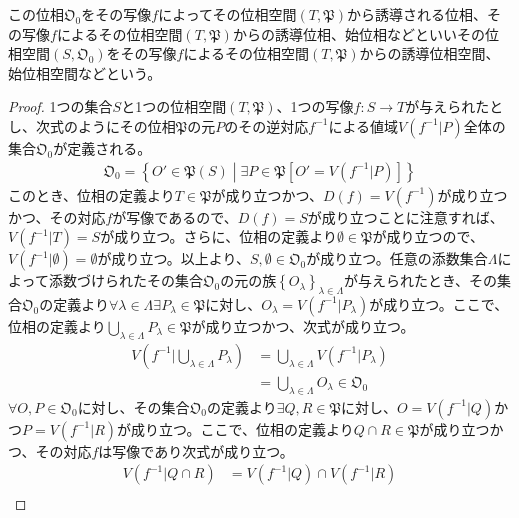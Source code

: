 \documentclass[dvipdfmx]{jsarticle}
\begin{document}
\begin{dfn}
この位相$\mathfrak{O}_{0}$をその写像$f$によってその位相空間$\left( T,\mathfrak{P} \right)$から誘導される位相、その写像$f$によるその位相空間$\left( T,\mathfrak{P} \right)$からの誘導位相、始位相などといいその位相空間$\left( S,\mathfrak{O}_{0} \right)$をその写像$f$によるその位相空間$\left( T,\mathfrak{P} \right)$からの誘導位相空間、始位相空間などという。
\end{dfn}
\begin{proof}
1つの集合$S$と1つの位相空間$\left( T,\mathfrak{P} \right)$、1つの写像$f:S \rightarrow T$が与えられたとし、次式のようにその位相$\mathfrak{P}$の元$P$のその逆対応$f^{- 1}$による値域$V\left( f^{- 1}|P \right)$全体の集合$\mathfrak{O}_{0}$が定義される。
\begin{align*}
\mathfrak{O}_{0} = \left\{ O'\in \mathfrak{P}(S) \middle| \exists P \in \mathfrak{P}\left[ O' = V\left( f^{- 1}|P \right) \right] \right\}
\end{align*}
このとき、位相の定義より$T \in \mathfrak{P}$が成り立つかつ、$D(f) = V\left( f^{- 1} \right)$が成り立つかつ、その対応$f$が写像であるので、$D(f) = S$が成り立つことに注意すれば、$V\left( f^{- 1}|T \right) = S$が成り立つ。さらに、位相の定義より$\mathfrak{\emptyset \in P}$が成り立つので、$V\left( f^{- 1}|\emptyset \right) = \emptyset$が成り立つ。以上より、$S,\emptyset \in \mathfrak{O}_{0}$が成り立つ。任意の添数集合$\varLambda$によって添数づけられたその集合$\mathfrak{O}_{0}$の元の族$\left\{ O_{\lambda} \right\}_{\lambda \in \varLambda}$が与えられたとき、その集合$\mathfrak{O}_{0}$の定義より$\forall\lambda \in \varLambda\exists P_{\lambda}\in \mathfrak{P}$に対し、$O_{\lambda} = V\left( f^{- 1}|P_{\lambda} \right)$が成り立つ。ここで、位相の定義より$\bigcup_{\lambda \in \varLambda} P_{\lambda}\in \mathfrak{P}$が成り立つかつ、次式が成り立つ。
\begin{align*}
V\left( f^{- 1}|\bigcup_{\lambda \in \varLambda} P_{\lambda} \right) &= \bigcup_{\lambda \in \varLambda} {V\left( f^{- 1}|P_{\lambda} \right)}\\
&= \bigcup_{\lambda \in \varLambda} O_{\lambda} \in \mathfrak{O}_{0}
\end{align*}
$\forall O,P \in \mathfrak{O}_{0}$に対し、その集合$\mathfrak{O}_{0}$の定義より$\exists Q,R \in \mathfrak{P}$に対し、$O = V\left( f^{- 1}|Q \right)$かつ$P = V\left( f^{- 1}|R \right)$が成り立つ。ここで、位相の定義より$Q \cap R \in \mathfrak{P}$が成り立つかつ、その対応$f$は写像であり次式が成り立つ。
\begin{align*}
V\left( f^{- 1}|Q \cap R \right) &= V\left( f^{- 1}|Q \right) \cap V\left( f^{- 1}|R \right)\\

\end{align*}
\end{proof}
\end{document}
